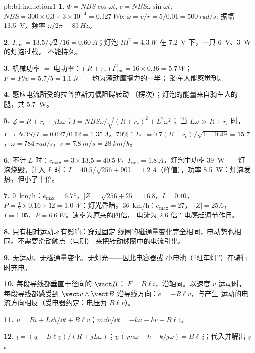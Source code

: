 \begin{solution}{pb:b1:induction:1}
\textbf{1.} $\Phi = NBS\cos\omega t$, $e = NBS\omega\sin\omega t$; $NBS = 300 \times
0.3 \times 3 \times 10^{-4} = \qty{0.027}{Wb}$; $\omega = v/r = 5/0.01 = \qty{500}{rad/s}$:
振幅 \qty{13.5}{V}，频率 $\omega/2\pi = \qty{80}{Hz}$。

\textbf{2.} $I_{\text{rms}} = 13.5/\sqrt2/16 = \qty{0.60}{A}$；灯泡 $RI^2 = \qty{4.3}{W}$
在 \qty{7.2}{V} 下，一只 \qty{6}{V}、\qty{3}{W} 的灯泡过载，
不能持久。

\textbf{3.} 机械功率 $=$ 电功率：$(R + r_c)I_{\text{rms}}^2 = 16 \times 0.36 =
\qty{5.7}{W}$；$F = P/v = 5.7/5 = \qty{1.1}{N}$——约为滚动摩擦力的一半；
骑车人能感觉到。

\textbf{4.} 感应电流所受的拉普拉斯力偶阻碍转动
（楞次）；灯泡的能量来自骑车人的腿，共 \qty{5.7}{W}。

\textbf{5.} $\underline Z = R + r_c + jL\omega$；$I = NBS\omega/\sqrt{(R + r_c)^2 + L^2\omega^2}$；
当 $L\omega \gg R + r_c$ 时，$I \to NBS/L = 0.027/0.02 = \qty{1.35}{A}$。$70\%$：$L\omega
= 0.7(R + r_c)/\sqrt{1 - 0.49} = 15.7$，$\omega = \qty{784}{rad/s}$，$v = \qty{7.8}{m/s}
= \qty{28}{km/h}$。

\textbf{6.} 不计 $L$ 时：$e_{\max} = 3 \times 13.5 = \qty{40.5}{V}$，$I_{\text{rms}} =
\qty{1.8}{A}$，灯泡中功率 \qty{39}{W}——灯泡烧毁。计入 $L$ 时：$I = 40.5/\sqrt{256 +
900} = \qty{1.2}{A}$（峰值），功率 \qty{8.5}{W}：灯泡发热，但小了十倍。

\textbf{7.} \qty{9}{km/h}：$e_{\max} = 6.75$，$|Z| = \sqrt{256 + 25} = 16.8$，$I = 0.40$，
$P = \tfrac12 \times 0.16 \times 12 = \qty{1.0}{W}$：灯光昏暗。\qty{36}{km/h}：$e_{\max} = 27$，
$|Z| = 25.6$，$I = 1.05$，$P = \qty{6.6}{W}$。速率为原来的四倍，
电流为 $2.6$ 倍：电感起调节作用。

\textbf{8.} 只有相对运动才有影响：穿过固定
线圈的磁通量变化完全相同，电动势也相同。不需要滑动触点（电刷）
来把转动线圈中的电流引出。

\textbf{9.} 无运动、无磁通量变化、无灯光——因此电容器或
小电池（“驻车灯”）在骑行时充电。

\textbf{10.} 每段导线都垂直于径向的 $\vect B$：
$F = B\ell i$，沿轴向。以速度 $v$ 运动时，每段导线都感受到 $\vect v\wedge\vect B$
沿导线方向：$e = -B\ell v$，与产生
运动的电流方向相反（受电器约定：电压为 $B\ell v$）。

\textbf{11.} $u = Ri + L\,\dd i/\dd t + B\ell v$；$m\,\dd v/\dd t = -kx - hv + B\ell i$。

\textbf{12.} $\underline i = (\underline u - B\ell\underline v)/(R + jL\omega)$；$\underline v\,(jm\omega + h +
k/j\omega) = B\ell\,\underline i$；代入并解出 $\underline v$。


\end{solution}
